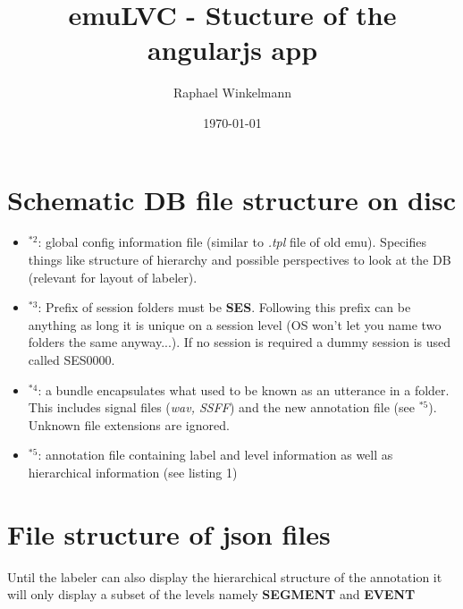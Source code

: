 \documentclass[A4,12pt, utf8]{article}
\title{emuLVC - Stucture of the angularjs app}
\author{Raphael Winkelmann}
\date{\today}
\newcounter{treeline}
\newcommand{\treeroot}[1]{%
\node[above] at (0,0) {#1};%
\setcounter{treeline}{0}
}
\newcommand{\altentry}[2]{%
\draw[->] (#2-1,-\value{treeline}/2) -- (#2-1,-\value{treeline}/2-0.5) -- (#2+0.5,-\value{treeline}/2-0.5) node[right] {#1};
\foreach \x in {1,...,#2}
{   \draw (\x-1,-\value{treeline}/2) -- (\x-1,-\value{treeline}/2-0.5);
}
\stepcounter{treeline}
}
\begin{document}

\section{Schematic DB file structure on disc}



\begin{itemize}
  \item $^{*2}$: global config information file (similar to \textit{.tpl} file of old emu). Specifies things like structure of hierarchy and possible perspectives to look at the DB (relevant for layout of labeler).
  \item $^{*3}$: Prefix of session folders must be \textbf{SES}. Following this prefix can be anything as long it is unique on a session level (OS won't let you name two folders the same anyway...). If no session is required a dummy session is used called SES0000.
  \item $^{*4}$: a bundle encapsulates what used to be known as an utterance in a folder. This includes signal files (\textit{wav, SSFF}) and the new annotation file (see $^{*5}$). Unknown file extensions are ignored.
  \item $^{*5}$: annotation file containing label and level information as well as hierarchical information (see listing 1)
\end{itemize}




\section{File structure of json files}

Until the labeler can also display the hierarchical structure of the annotation it will only 
display a subset of the levels namely \textbf{SEGMENT} and \textbf{EVENT}
\end{document}
